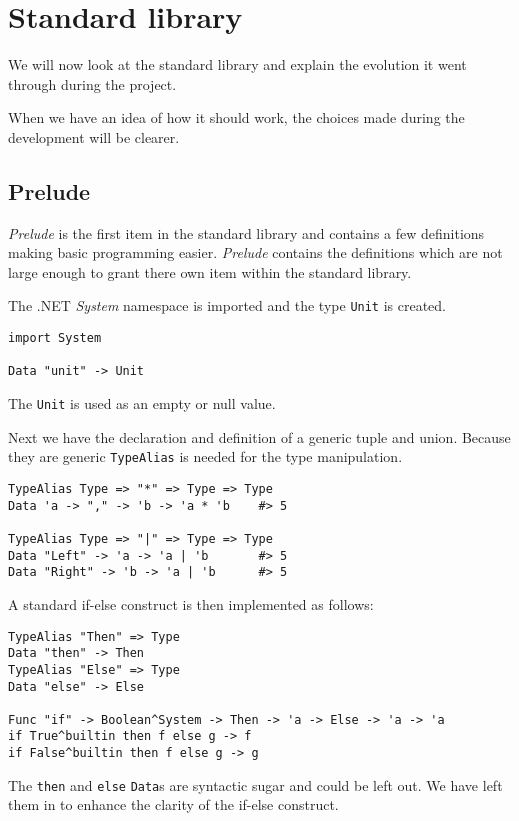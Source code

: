 \chapter{Standard library}\label{chap:standardlibrary}
We will now look at the standard library and explain the evolution it went through during the project.

When we have an idea of how it should work, the choices made during the development will be clearer.

\section{Prelude}\label{sec:standardprelude}
\emph{Prelude} is the first item in the standard library and contains a few definitions making basic programming easier.
\emph{Prelude} contains the definitions which are not large enough to grant there own item within the standard library.

The .NET \emph{System} namespace is imported and the type \texttt{Unit} is created.

\begin{lstlisting}
import System

Data "unit" -> Unit
\end{lstlisting}

The \texttt{Unit} is used as an empty or null value.

Next we have the declaration and definition of a generic tuple and union.
Because they are generic \texttt{TypeAlias} is needed for the type manipulation.

\begin{lstlisting}
TypeAlias Type => "*" => Type => Type
Data 'a -> "," -> 'b -> 'a * 'b    #> 5

TypeAlias Type => "|" => Type => Type
Data "Left" -> 'a -> 'a | 'b       #> 5
Data "Right" -> 'b -> 'a | 'b      #> 5
\end{lstlisting}

A standard if-else construct is then implemented as follows:

\begin{lstlisting}
TypeAlias "Then" => Type
Data "then" -> Then
TypeAlias "Else" => Type
Data "else" -> Else

Func "if" -> Boolean^System -> Then -> 'a -> Else -> 'a -> 'a
if True^builtin then f else g -> f
if False^builtin then f else g -> g
\end{lstlisting}

The \texttt{then} and \texttt{else} \texttt{Data}s are syntactic sugar and could be left out.
We have left them in to enhance the clarity of the if-else construct.

